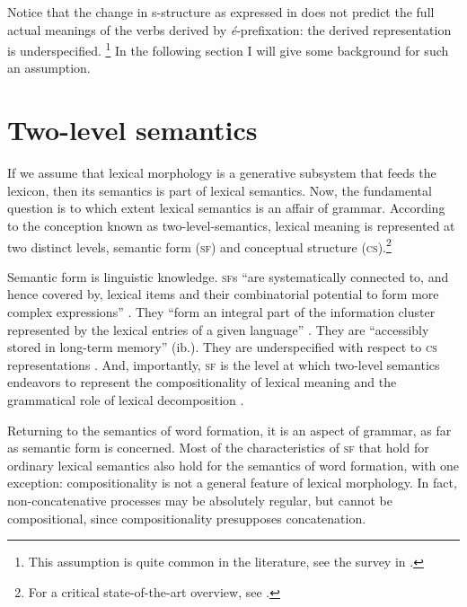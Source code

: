 \documentclass[output=paper]{langsci/langscibook}
\begin{document}
Notice that the change in s-structure as expressed in  does not predict the full actual meanings of the verbs derived by
\emph{é}-prefixation: the derived representation is underspecified.%
\footnote{This assumption is quite common in the literature, see the survey in %
\citet[282--284]{Tribout2010a}%
%
.} In the following section I will give some background for such an assumption.

\section{Two-level semantics}\label{two-level-semantics}

If we assume that lexical morphology is a generative subsystem that feeds the lexicon, then its semantics is part of lexical semantics. Now,
the fundamental question is to which extent lexical semantics is an affair of grammar. According to the conception known as two-level-semantics, lexical meaning is represented at two distinct levels, semantic form (\textsc{sf}) and conceptual structure (\textsc{cs}).\footnote{For a critical state-of-the-art overview, see %
\citet{LangMaienborn2011}%
%
.}

Semantic form is linguistic knowledge. \textsc{sf}s \enquote{are systematically connected to, and hence covered by, lexical items and their combinatorial potential to form more complex expressions} %
\citep[711]{LangMaienborn2011}%
%
. They \enquote{form an integral part of the information cluster represented by the lexical entries of a given language} %
\citep[711]{LangMaienborn2011}%
%
. They are \enquote{accessibly stored in long-term memory} (ib.). They are underspecified with respect to \textsc{cs} representations %
\citep[713]{LangMaienborn2011}%
%
. And, importantly,
\textsc{sf} is the level at which two-level semantics endeavors to represent the compositionality of lexical meaning and the grammatical role of lexical decomposition %
\citep[723]{LangMaienborn2011}%
.

Returning to the semantics of word formation, it is an aspect of grammar, as far as semantic form is concerned. Most of the characteristics of \textsc{sf} that hold for ordinary lexical semantics also hold for the semantics of word formation, with one exception:
compositionality is not a general feature of lexical morphology. In fact, non-concatenative processes may be absolutely regular, but cannot be compositional, since compositionality presupposes concatenation.
\end{document}
